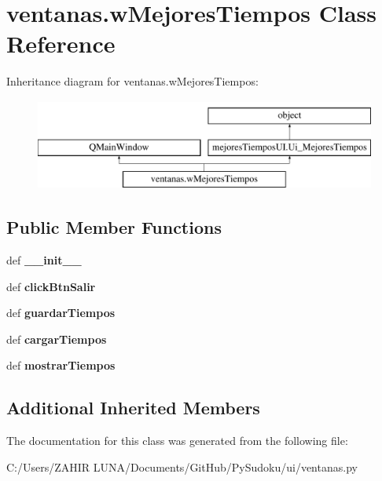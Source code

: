 \hypertarget{classventanas_1_1w_mejores_tiempos}{\section{ventanas.\-w\-Mejores\-Tiempos Class Reference}
\label{classventanas_1_1w_mejores_tiempos}
}
Inheritance diagram for ventanas.\-w\-Mejores\-Tiempos\-:\begin{figure}[H]
\begin{center}
\leavevmode
\includegraphics[height=3.000000cm]{classventanas_1_1w_mejores_tiempos}
\end{center}
\end{figure}
\subsection*{Public Member Functions}
\begin{DoxyCompactItemize}
\item 
\hypertarget{classventanas_1_1w_mejores_tiempos_a9144362cf6259852285fdf4b0f7ab39b}{def {\bfseries \-\_\-\-\_\-init\-\_\-\-\_\-}}\label{classventanas_1_1w_mejores_tiempos_a9144362cf6259852285fdf4b0f7ab39b}

\item 
\hypertarget{classventanas_1_1w_mejores_tiempos_a1d1586af2cb7d6e4b16fc14b963a7b33}{def {\bfseries click\-Btn\-Salir}}\label{classventanas_1_1w_mejores_tiempos_a1d1586af2cb7d6e4b16fc14b963a7b33}

\item 
\hypertarget{classventanas_1_1w_mejores_tiempos_a4a22501803f7b0dfef0fae412d16eddd}{def {\bfseries guardar\-Tiempos}}\label{classventanas_1_1w_mejores_tiempos_a4a22501803f7b0dfef0fae412d16eddd}

\item 
\hypertarget{classventanas_1_1w_mejores_tiempos_a913d4d800d0492c403cf5668646ee629}{def {\bfseries cargar\-Tiempos}}\label{classventanas_1_1w_mejores_tiempos_a913d4d800d0492c403cf5668646ee629}

\item 
\hypertarget{classventanas_1_1w_mejores_tiempos_a7a3c86fec7473b1b05266a69bb418a9a}{def {\bfseries mostrar\-Tiempos}}\label{classventanas_1_1w_mejores_tiempos_a7a3c86fec7473b1b05266a69bb418a9a}

\end{DoxyCompactItemize}
\subsection*{Additional Inherited Members}


The documentation for this class was generated from the following file\-:\begin{DoxyCompactItemize}
\item 
C\-:/\-Users/\-Z\-A\-H\-I\-R  L\-U\-N\-A/\-Documents/\-Git\-Hub/\-Py\-Sudoku/ui/ventanas.\-py\end{DoxyCompactItemize}
